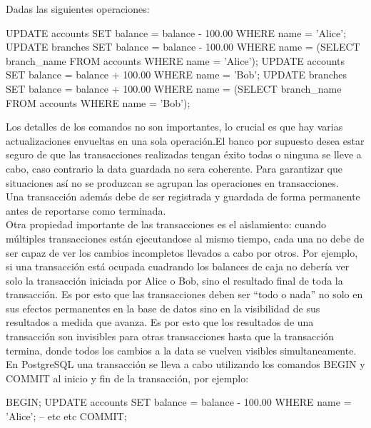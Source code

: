 Dadas las siguientes operaciones:\\

\begin{pyglist}
UPDATE accounts SET balance = balance - 100.00
WHERE name = 'Alice';
UPDATE branches SET balance = balance - 100.00
WHERE name = (SELECT branch_name FROM accounts WHERE name = 'Alice');
UPDATE accounts SET balance = balance + 100.00
WHERE name = 'Bob';
UPDATE branches SET balance = balance + 100.00
WHERE name = (SELECT branch_name FROM accounts WHERE name = 'Bob');
\end{pyglist}

Los detalles de los comandos no son importantes, lo crucial es que hay varias actualizaciones envueltas en una sola operación.El banco por supuesto desea estar seguro de que las transacciones realizadas tengan éxito todas o ninguna se lleve a cabo, caso contrario la data guardada no sera coherente. Para garantizar que situaciones así no se produzcan se agrupan las operaciones en transacciones.\\

Una transacción además debe de ser registrada y guardada de forma permanente antes de reportarse como terminada.\\

Otra propiedad importante de las transacciones es el aislamiento: cuando múltiples transacciones están ejecutandose al mismo tiempo, cada una no debe de ser capaz de ver los cambios incompletos llevados a cabo por otros. Por ejemplo, si una transacción está ocupada cuadrando los balances de caja no debería ver solo la transacción iniciada por Alice o Bob, sino el resultado final de toda la transacción. Es por esto que las transacciones deben ser ``todo o nada'' no solo en sus efectos permanentes en la base de datos sino en la visibilidad de sus resultados a medida que avanza. Es por esto que los resultados de una transacción son invisibles para otras transacciones hasta que la transacción termina, donde todos los cambios a la data se vuelven visibles simultaneamente.\\

En PostgreSQL una transacción se lleva a cabo utilizando los comandos BEGIN y COMMIT al inicio y fin de la transacción, por ejemplo:\\

\begin{pyglist}
BEGIN;
UPDATE accounts SET balance = balance - 100.00
WHERE name = 'Alice';
-- etc etc
COMMIT;
\end{pyglist}

